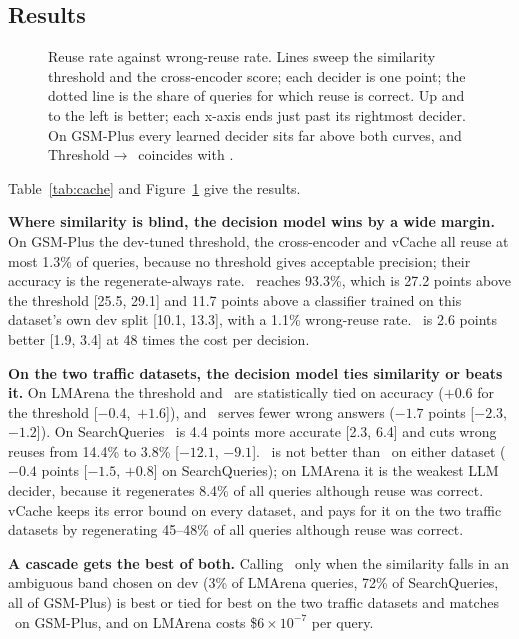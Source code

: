 \subsection{Results}

\begin{figure}[t]
\centering
{}
\caption{Reuse rate against wrong-reuse rate. Lines sweep the similarity threshold and the cross-encoder score; each decider is one point; the dotted line is the share of queries for which reuse is correct. Up and to the left is better; each x-axis ends just past its rightmost decider. On GSM-Plus every learned decider sits far above both curves, and Threshold$\to$\jev\ coincides with \jev.}
\label{fig:cache}
\end{figure}

Table~\ref{tab:cache} and Figure~\ref{fig:cache} give the results.

\textbf{Where similarity is blind, the decision model wins by a wide margin.}
On GSM-Plus the dev-tuned threshold, the cross-encoder and vCache all reuse at most 1.3\% of queries, because no threshold gives acceptable precision; their accuracy is the regenerate-always rate.
\jev\ reaches 93.3\%, which is 27.2 points above the threshold [25.5, 29.1] and 11.7 points above a classifier trained on this dataset's own dev split [10.1, 13.3], with a 1.1\% wrong-reuse rate.
\gbig\ is 2.6 points better [1.9, 3.4] at 48 times the cost per decision.

\textbf{On the two traffic datasets, the decision model ties similarity or beats it.}
On LMArena the threshold and \jev\ are statistically tied on accuracy ($+0.6$ for the threshold [$-0.4$,~$+1.6$]), and \jev\ serves fewer wrong answers ($-1.7$ points [$-2.3$, $-1.2$]).
On SearchQueries \jev\ is 4.4 points more accurate [2.3, 6.4] and cuts wrong reuses from 14.4\% to 3.8\% [$-12.1$, $-9.1$].
\gbig\ is not better than \jev\ on either dataset ($-0.4$ points [$-1.5$, $+0.8$] on SearchQueries); on LMArena it is the weakest LLM decider, because it regenerates 8.4\% of all queries although reuse was correct.
vCache keeps its error bound on every dataset, and pays for it on the two traffic datasets by regenerating 45--48\% of all queries although reuse was correct.

\textbf{A cascade gets the best of both.}
Calling \jev\ only when the similarity falls in an ambiguous band chosen on dev (3\% of LMArena queries, 72\% of SearchQueries, all of GSM-Plus) is best or tied for best on the two traffic datasets and matches \jev\ on GSM-Plus, and on LMArena costs \$$6\times10^{-7}$ per query.

